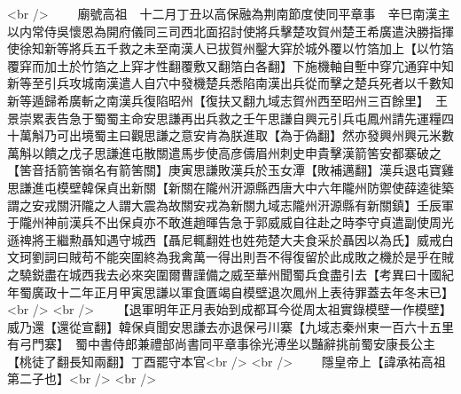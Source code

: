 <br />
　　廟號高祖　十二月丁丑以高保融為荆南節度使同平章事　辛巳南漢主以内常侍吳懷恩為開府儀同三司西北面招討使將兵擊楚攻賀州楚王希廣遣決勝指揮使徐知新等將兵五千救之未至南漢人已拔賀州鑿大穽於城外覆以竹箔加上【以竹箔覆穽而加土於竹箔之上穽才性翻覆敷又翻箔白各翻】下施機軸自塹中穿宂通穽中知新等至引兵攻城南漢遣人自穴中發機楚兵悉陷南漢出兵從而擊之楚兵死者以千數知新等遁歸希廣斬之南漢兵復陷昭州【復扶又翻九域志賀州西至昭州三百餘里】　王景崇累表告急于蜀蜀主命安思謙再出兵救之壬午思謙自興元引兵屯鳳州請先運糧四十萬斛乃可出境蜀主曰觀思謙之意安肯為朕進取【為于偽翻】然亦發興州興元米數萬斛以饋之戊子思謙進屯散關遣馬步使高彦儔眉州刺史申貴擊漢箭筈安都寨破之【筈音括箭筈嶺名有箭筈關】庚寅思謙敗漢兵於玉女潭【敗補邁翻】漢兵退屯寶雞思謙進屯模壁韓保貞出新關【新關在隴州汧源縣西唐大中六年隴州防禦使薛逵徙築謂之安戎關汧隴之人謂大震為故關安戎為新關九域志隴州汧源縣有新關鎮】壬辰軍于隴州神前漢兵不出保貞亦不敢進趙暉告急于郭威威自往赴之時李守貞遣副使周光遜禆將王繼勲聶知遇守城西【聶尼輒翻姓也姓苑楚大夫食采於聶因以為氏】威戒白文珂劉詞曰賊苟不能突圍終為我禽萬一得出則吾不得復留於此成敗之機於是乎在賊之驍鋭盡在城西我去必來突圍爾曹謹備之威至華州聞蜀兵食盡引去【考異曰十國紀年蜀廣政十二年正月甲寅思謙以軍食匱竭自模壁退次鳳州上表待罪蓋去年冬末已】<br />
<br />
　　【退軍明年正月表始到成都耳今從周太祖實錄模壁一作模壁】威乃還【還從宣翻】韓保貞聞安思謙去亦退保弓川寨【九域志秦州東一百六十五里有弓門寨】　蜀中書侍郎兼禮部尚書同平章事徐光溥坐以豔辭挑前蜀安康長公主【桃徒了翻長知兩翻】丁酉罷守本官<br />
<br />
　　隱皇帝上【諱承祐高祖第二子也】<br />
<br />
